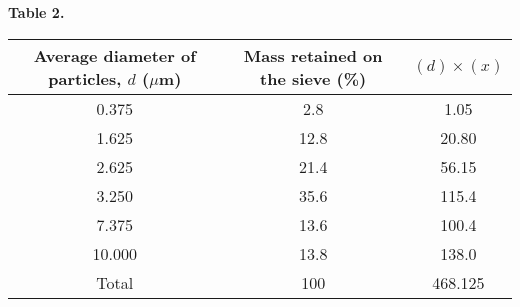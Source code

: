 \textbf{Table 2.}
\begin{center}
\begin{tabular}{|c|c|c|}
\hline
Average diameter of particles, $d$ ($\mu$m) & Mass retained on the sieve (\%) & $(d) \times (x)$ \\
\hline
0.375 & 2.8 & 1.05 \\
1.625 & 12.8 & 20.80 \\
2.625 & 21.4 & 56.15 \\
3.250 & 35.6 & 115.4 \\
7.375 & 13.6 & 100.4 \\
10.000 & 13.8 & 138.0 \\
\hline
Total & 100 & 468.125 \\
\hline
\end{tabular}
\end{center}
